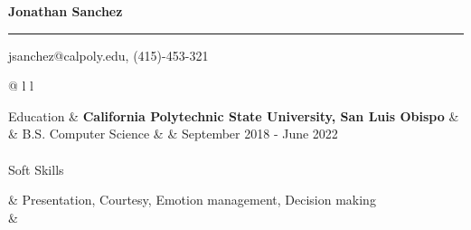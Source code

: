 \documentclass[letterpaper,11pt,oneside]{article}%
\begin{document}
%
\pagestyle{empty}%
\normalsize%
\begin{flushleft}%
\newcommand{\NameEntry}[1]{
                            \noindent \LARGE{\textbf{#1}}
                            \linebreak
                            \vspace{-2ex}
                            \hrule
                            \normalsize
                        }%
\newcommand{\PageSpacing}[0]{
                            \vspace{1em}
                            \noindent
                        }%
\newcommand{\EducationEntry}[3]{
                            \Large{Education}
                            & \textbf{California Polytechnic State University, San Luis Obispo}
                            & \linebreak
                            & B.S. {#1}
                            & \linebreak
                            & September {#2} - June {#3} \\
                            \\
                        }%
\newcommand{\WorkEntryTitle}[1]{
                            & \textbf{#1}
                            \\
                        }%
\newcommand{\WorkEntry}[1]{
                            & \parbox{5.0in}{#1} \\
                            \\
                        }%
\newcommand{\ItemEntry}[1]{
                            & {#1} \\
                        }%
\newcommand{\EndSection}[0]{
                            & \\
                        }%
\NameEntry{Jonathan Sanchez}%
\begin{flushright}%
jsanchez@calpoly.edu, (415){-}453{-}321%
\end {flushright}%
\PageSpacing%
\begin{tabular}{@{} l l}%
\EducationEntry{Computer Science}{2018}{2022}%
\Large{Soft Skills}%
\ItemEntry{Presentation, Courtesy, Emotion management, Decision making}%
\EndSection%
\end{tabular}%
\end{flushleft}%
\end{document}
